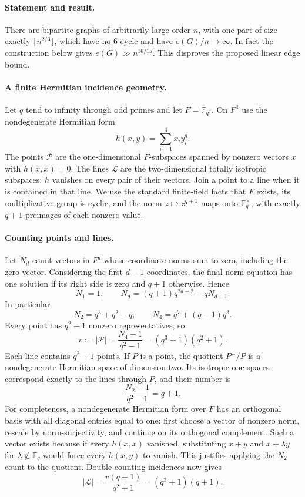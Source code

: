 \paragraph{Statement and result.}
There are bipartite graphs of arbitrarily large order \(n\), with one part of size exactly \(\lfloor n^{2/3}\rfloor\), which have no \(6\)-cycle and have \(e(G)/n\to\infty\). In fact the construction below gives \(e(G)\gg n^{16/15}\). This disproves the proposed linear edge bound.

\paragraph{A finite Hermitian incidence geometry.}
Let \(q\) tend to infinity through odd primes and let \(F=\mathbb F_{q^2}\). On \(F^4\) use the nondegenerate Hermitian form
\[
 h(x,y)=\sum_{i=1}^4 x_i y_i^q.
\]
The points \(\mathcal P\) are the one-dimensional \(F\)-subspaces spanned by nonzero vectors \(x\) with \(h(x,x)=0\). The lines \(\mathcal L\) are the two-dimensional totally isotropic subspaces: \(h\) vanishes on every pair of their vectors. Join a point to a line when it is contained in that line.
We use the standard finite-field facts that \(F\) exists, its multiplicative group is cyclic, and the norm \(z\mapsto z^{q+1}\) maps onto \(\mathbb F_q^\times\), with exactly \(q+1\) preimages of each nonzero value.

\paragraph{Counting points and lines.}
Let \(N_d\) count vectors in \(F^d\) whose coordinate norms sum to zero, including the zero vector. Considering the first \(d-1\) coordinates, the final norm equation has one solution if its right side is zero and \(q+1\) otherwise. Hence
\[
 N_1=1,\qquad
 N_d=(q+1)q^{2d-2}-qN_{d-1}.
\]
In particular
\[
 N_2=q^3+q^2-q,\qquad
 N_4=q^7+(q-1)q^3.
\]
Every point has \(q^2-1\) nonzero representatives, so
\[
 v:=|\mathcal P|=\frac{N_4-1}{q^2-1}
 =(q^3+1)(q^2+1).
 \tag{1}
\]
Each line contains \(q^2+1\) points. If \(P\) is a point, the quotient \(P^\perp/P\) is a nondegenerate Hermitian space of dimension two. Its isotropic one-spaces correspond exactly to the lines through \(P\), and their number is
\[
 \frac{N_2-1}{q^2-1}=q+1.
 \tag{2}
\]
For completeness, a nondegenerate Hermitian form over \(F\) has an orthogonal basis with all diagonal entries equal to one: first choose a vector of nonzero norm, rescale by norm-surjectivity, and continue on its orthogonal complement. Such a vector exists because if every \(h(x,x)\) vanished, substituting \(x+y\) and \(x+\lambda y\) for \(\lambda\notin\mathbb F_q\) would force every \(h(x,y)\) to vanish. This justifies applying the \(N_2\) count to the quotient. Double-counting incidences now gives
\[
 |\mathcal L|=\frac{v(q+1)}{q^2+1}
 =(q^3+1)(q+1).
 \tag{3}
\]

